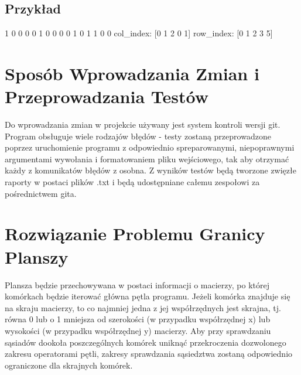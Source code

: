 \documentclass[11pt,a4paper]{report}
\begin{document}
\subsection{Przykład}
1 0 0 0
0 1 0 0
0 0 1 0
1 1 0 0
col\_index: [0 1 2 0 1]
row\_index: [0 1 2 3 5]

\section{Sposób Wprowadzania Zmian i Przeprowadzania Testów}\label{sec:teskt}
Do wprowadzania zmian w projekcie używany jest system kontroli wersji git.
Program obsługuje wiele rodzajów błędów - testy zostaną przeprowadzone poprzez uruchomienie programu z odpowiednio spreparowanymi, niepoprawnymi argumentami wywołania i formatowaniem pliku wejściowego, tak aby otrzymać każdy z komunikatów błędów z osobna.
Z wyników testów będą tworzone zwięzłe raporty w postaci plików .txt i będą udostępniane całemu zespołowi za pośrednictwem gita.

\section {Rozwiązanie Problemu Granicy Planszy}\label{sec:teskt}
Plansza będzie przechowywana w postaci informacji o macierzy, po której komórkach będzie iterować główna pętla programu.
Jeżeli komórka znajduje się na skraju macierzy, to co najmniej jedna z jej współrzędnych jest skrajna, tj. równa 0 lub o 1 mniejsza od szerokości (w przypadku współrzędnej x) lub wysokości (w przypadku współrzędnej y) macierzy.
Aby przy sprawdzaniu sąsiadów dookoła poszczególnych komórek uniknąć przekroczenia dozwolonego zakresu operatorami pętli, zakresy sprawdzania sąsiedztwa zostaną odpowiednio ograniczone dla skrajnych komórek.
\end{document}
